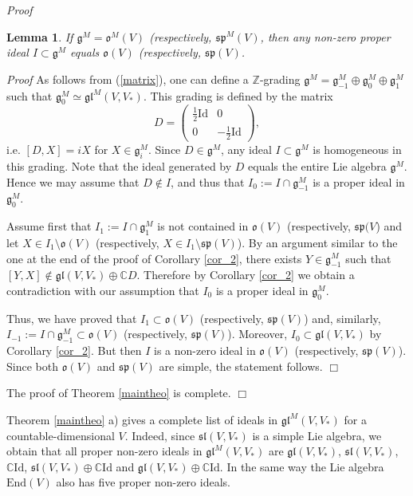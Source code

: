 \documentclass{svmult}
\newtheorem{lem}[theo]{Lemma}
\renewenvironment{proof}{ \emph{Proof}}{$\Box$}
\newcommand {\CC} {\mathbb {C}}
\renewcommand{\sp}{\mathfrak{sp}}
\renewcommand{\sl}{\mathfrak{sl}}
\newcommand{\ojl}{\mathfrak{gl}}
\newcommand{\id}{\mathrm{Id}}
\newcommand{\oo}{\mathfrak{o}}
\renewcommand{\gg}{\mathfrak{g}}
\newcommand{\gl}{\mathfrak{gl}}
\newcommand{\End}{\mathrm{End}}
\begin{document}
\begin{proof}
\begin{lem}\label{lem_idideal}
 If $\gg^M = \oo^M(V)$ (respectively, $ \sp^M(V)$, then any non-zero proper ideal $I \subset \gg^M$ 
equals $\oo(V)$  (respectively, $\sp(V)$.
\end{lem}

\begin{proof} As follows from (\ref{matrix}), one can define a $\mathbb Z$-grading 
 $\gg^M=\gg^M_{-1} \oplus \gg^M_0 \oplus \gg^M_1$ such that $\gg^M_0 \simeq {\ojl}^M(V,V_*)$. 
This  grading is defined by the matrix
\begin{equation}\label{grad_matrix}
D=\left(
\begin{array}{c|c}
 \frac{1}{2}\mathrm{Id} & 0 \\ \hline
 0 & -\frac{1}{2}\mathrm{Id} 
\end{array}
\right),\nonumber 
\end{equation}
i.e. $[D,X] = iX$ for $X \in \gg^M_i$. Since $D\in\gg^M$, any ideal $I\subset\gg^M$ is homogeneous in this grading. Note that the ideal generated by $D$ equals the entire Lie  algebra  $\gg^M$. Hence we may assume that $D\notin I$, and thus that $I_0 := I \cap \gg^M_{-1}$ is a proper ideal in $\gg^M_0$.  

Assume first that $I_1:=I \cap \gg_1^M$ is not contained in 
$\oo(V)$  (respectively, $\sp(V$) and let $X\in I_1\setminus \oo(V) $ (respectively, $X\in I_1\setminus \sp(V) $). 
By an argument similar to the one at the end of the proof of Corollary \ref{cor_2}, there exists $Y\in \gg^M_{-1}$ such that 
$[Y,X]\notin  \gl(V,V_*)\oplus \CC D$. Therefore by Corollary \ref{cor_2} we obtain a contradiction with our assumption that $I_0$ is a proper ideal in $\gg^M_0$.

Thus, we have proved that $I_1\subset \oo(V)$   (respectively, $\sp(V)$) and, similarly, $I_{-1}:=I \cap \gg_{-1}^M \subset \oo(V)$   (respectively, $\sp(V)$). 
Moreover, $I_0\subset  \gl (V,V_*)$ by Corollary  \ref{cor_2}. But then $I$ is a non-zero ideal in  $\oo(V)$   (respectively, $\sp(V)$).
Since both  $\oo(V)$ and $\sp(V)$ are simple, the statement follows.
\end{proof}

The proof of Theorem \ref{maintheo} is complete.
\end{proof}

\vspace{0.33cm}

Theorem \ref{maintheo} a) gives a complete list of ideals in  $\gl^M(V,V_*)$ for a countable-dimensional $V$. 
Indeed, since $\sl(V,V_*)$ is a simple Lie algebra, we obtain that all 
proper non-zero ideals in $\gl^M(V,V_*)$ are $\gl(V,V_*)$, $\sl(V,V_*)$, $\CC\id$,   $\sl(V,V_*)\oplus\CC\id$ and $\gl(V,V_*)\oplus\CC\id$.
In the same way the Lie algebra $\End(V)$ also has five proper non-zero ideals. 
\end{document}
